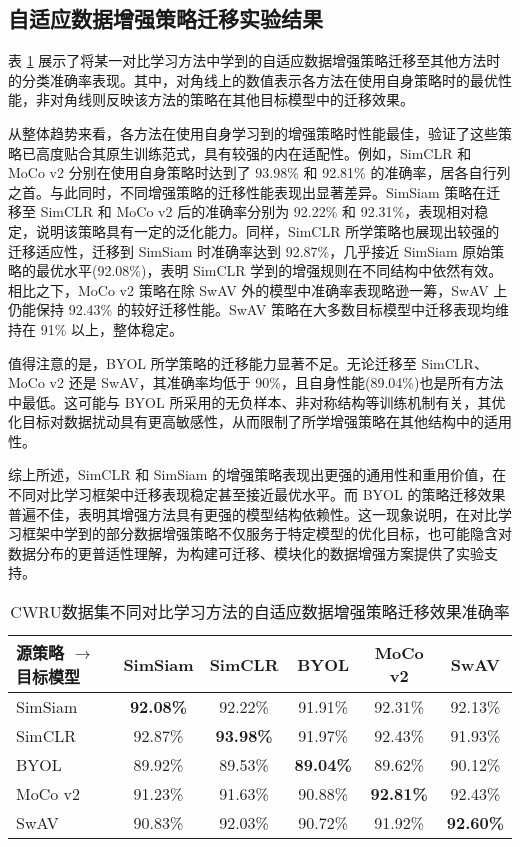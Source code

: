 \documentclass[master]{thesis-uestc}
\begin{document}
\subsection{自适应数据增强策略迁移实验结果}
表 \ref{tab:autoaugment_transfer_estimation} 展示了将某一对比学习方法中学到的自适应数据增强策略迁移至其他方法时的分类准确率表现。其中，对角线上的数值表示各方法在使用自身策略时的最优性能，非对角线则反映该方法的策略在其他目标模型中的迁移效果。

从整体趋势来看，各方法在使用自身学习到的增强策略时性能最佳，验证了这些策略已高度贴合其原生训练范式，具有较强的内在适配性。例如，SimCLR 和 MoCo v2 分别在使用自身策略时达到了 93.98\% 和 92.81\% 的准确率，居各自行列之首。与此同时，不同增强策略的迁移性能表现出显著差异。SimSiam 策略在迁移至 SimCLR 和 MoCo v2 后的准确率分别为 92.22\% 和 92.31\%，表现相对稳定，说明该策略具有一定的泛化能力。同样，SimCLR 所学策略也展现出较强的迁移适应性，迁移到 SimSiam 时准确率达到 92.87\%，几乎接近 SimSiam 原始策略的最优水平(92.08\%)，表明 SimCLR 学到的增强规则在不同结构中依然有效。相比之下，MoCo v2 策略在除 SwAV 外的模型中准确率表现略逊一筹，SwAV 上仍能保持 92.43\% 的较好迁移性能。SwAV 策略在大多数目标模型中迁移表现均维持在 91\% 以上，整体稳定。

值得注意的是，BYOL 所学策略的迁移能力显著不足。无论迁移至 SimCLR、MoCo v2 还是 SwAV，其准确率均低于 90\%，且自身性能(89.04\%)也是所有方法中最低。这可能与 BYOL 所采用的无负样本、非对称结构等训练机制有关，其优化目标对数据扰动具有更高敏感性，从而限制了所学增强策略在其他结构中的适用性。

综上所述，SimCLR 和 SimSiam 的增强策略表现出更强的通用性和重用价值，在不同对比学习框架中迁移表现稳定甚至接近最优水平。而 BYOL 的策略迁移效果普遍不佳，表明其增强方法具有更强的模型结构依赖性。这一现象说明，在对比学习框架中学到的部分数据增强策略不仅服务于特定模型的优化目标，也可能隐含对数据分布的更普适性理解，为构建可迁移、模块化的数据增强方案提供了实验支持。


\begin{table}[h]
    \centering
    \caption{CWRU数据集不同对比学习方法的自适应数据增强策略迁移效果准确率}
    \renewcommand\arraystretch{1.3}
    \begin{tabular}{lccccc}
        \toprule
        源策略 $\rightarrow$ 目标模型 & SimSiam & SimCLR & BYOL & MoCo v2 & SwAV \\
        \midrule
        SimSiam    & \textbf{92.08\%} & 92.22\% & 91.91\% & 92.31\% & 92.13\% \\
        SimCLR     & 92.87\% & \textbf{93.98\%} & 91.97\% & 92.43\% & 91.93\% \\
        BYOL       & 89.92\% & 89.53\% & \textbf{89.04\%} & 89.62\% & 90.12\% \\
        MoCo v2    & 91.23\% & 91.63\% & 90.88\% & \textbf{92.81\%} & 92.43\% \\
        SwAV       & 90.83\% & 92.03\% & 90.72\% & 91.92\% & \textbf{92.60\%} \\
        \bottomrule
    \end{tabular}
    \label{tab:autoaugment_transfer_estimation}
\end{table}
\end{document}
